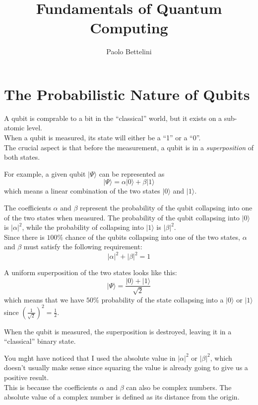 \documentclass[a4paper]{article}
\title{Fundamentals of Quantum Computing}
\author{Paolo Bettelini}
\date{}
\newcommand{\quotes}[1]{``#1''}
\begin{document}
\maketitle
\tableofcontents
\pagebreak

\section{The Probabilistic Nature of Qubits}

A qubit is comprable to a bit in the \quotes{classical} world, but it exists on a sub-atomic level. \\
When a qubit is measured, its state will either be a \quotes{1} or a \quotes{0}. \\
The crucial aspect is that before the measurement, a qubit is in a \textit{superposition} of both states.

For example, a given qubit \(|\Psi\rangle\) can be represented as
\[
    |\Psi\rangle=\alpha |0\rangle+\beta |1\rangle
\]
which means a linear combination of the two states \(|0\rangle\) and \(|1\rangle\).

The coefficients \(\alpha\) and \(\beta\) represent the probability of the qubit collapsing into one of the two states when measured.
The probability of the qubit collapsing into \(|0\rangle\) is \(|\alpha|^2\),
while the probability of collapsing into \(|1\rangle\) is \(|\beta|^2\). \\
Since there is \(100\%\) chance of the qubits collapsing into one of the two states, \(\alpha\) and \(\beta\) must satisfy the following requirement:
\[
    |\alpha|^2+|\beta|^2=1
\]

A uniform superposition of the two states looks like this:
\[
    |\Psi\rangle=\frac{|0\rangle+|1\rangle}{\sqrt{2}}
\]
which means that we have \(50\%\) probability of the state collapsing into a \(|0\rangle\) or \(|1\rangle\)
since \({\left(\frac{1}{\sqrt{2}}\right)}^2=\frac{1}{2}\).

When the qubit is measured, the superposition is destroyed, leaving it in a \quotes{classical} binary state.

You mght have noticed that I used the absolute value in \(|\alpha|^2\) or \(|\beta|^2\), which doesn't usually make sense since squaring the value is already going to give us a positive result.
\\
This is because the coefficients \(\alpha\) and \(\beta\) can also be complex numbers. The absolute value of a complex number is defined as its distance from the origin.
\end{document}
